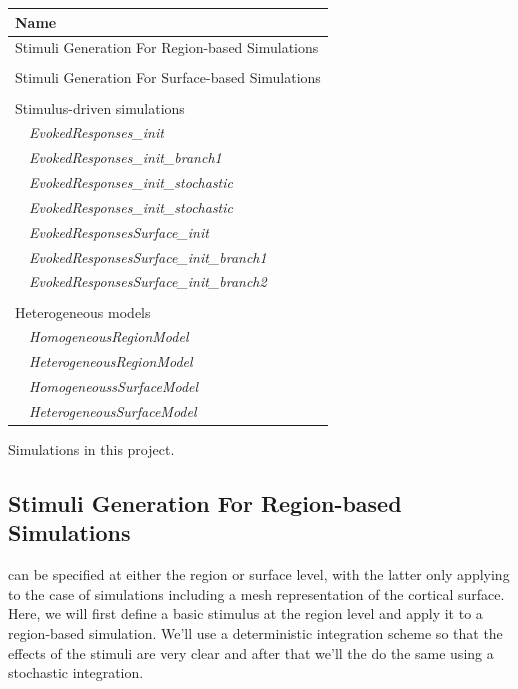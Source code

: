 \documentclass{tufte-handout}
\begin{document}
\begin{margintable}
  \centering
  \selectfont
  \begin{tabular}{l}
    \toprule
    Name \\
    \midrule
    Stimuli Generation For Region-based Simulations\\
    \\
    Stimuli Generation For Surface-based Simulations\\
    \\
    \multicolumn{1}{l}{Stimulus-driven simulations}\\
    $\quad$\textit{EvokedResponses\_init} \\
    $\quad$\textit{EvokedResponses\_init\_branch1}  \\ 
    $\quad$\textit{EvokedResponses\_init\_stochastic}  \\ 
    $\quad$\textit{EvokedResponses\_init\_stochastic}  \\ 
     $\quad$\textit{EvokedResponsesSurface\_init} \\
    $\quad$\textit{EvokedResponsesSurface\_init\_branch1} \\
     $\quad$\textit{EvokedResponsesSurface\_init\_branch2} \\
     \\
         \multicolumn{1}{l}{Heterogeneous models}\\
     $\quad$\textit{HomogeneousRegionModel}\\
     $\quad$\textit{HeterogeneousRegionModel} \\
     $\quad$\textit{HomogeneoussSurfaceModel}\\
     $\quad$\textit{HeterogeneousSurfaceModel}\\
    \bottomrule
  \end{tabular}
  \caption{Simulations in this project.}
  \label{tab:normaltab}
\end{margintable}

\subsection{Stimuli Generation For Region-based Simulations}\label{sec:region_stim}

 can be specified at either the region or surface level,
with the latter only applying to the case of simulations including a mesh
representation of the cortical surface. Here, we will first define a basic
stimulus at the region level and apply it to a region-based simulation. We'll
use a deterministic integration scheme so that the effects of the stimuli are
very clear and after that  we'll the do the same using a stochastic
integration. 
\end{document}
